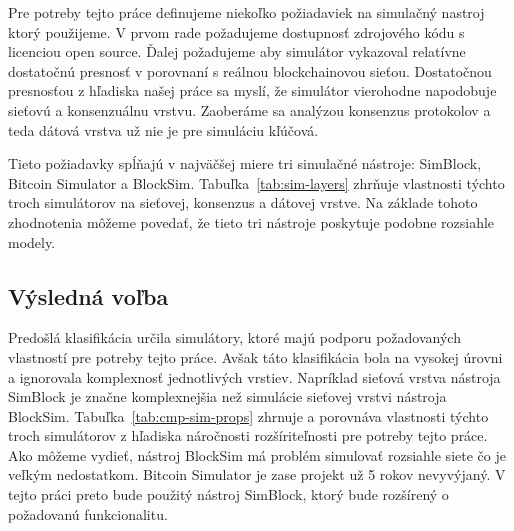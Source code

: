 Pre potreby tejto práce definujeme niekoľko požiadaviek na simulačný nastroj ktorý použijeme. V prvom rade požadujeme dostupnosť zdrojového kódu s licenciou open source. Ďalej požadujeme aby simulátor vykazoval relatívne dostatočnú presnosť v porovnaní s reálnou blockchainovou sieťou. Dostatočnou presnosťou z hľadiska našej práce sa myslí, že simulátor vierohodne napodobuje sieťovú a konsenzuálnu vrstvu. Zaoberáme sa analýzou konsenzus protokolov a teda dátová vrstva už nie je pre simuláciu kľúčová. 

Tieto požiadavky spĺňajú v najväčšej miere tri simulačné nástroje: SimBlock, Bitcoin Simulator a BlockSim. Tabuľka~\ref{tab:sim-layers} zhrňuje vlastnosti týchto troch simulátorov na sieťovej, konsenzus a dátovej vrstve. Na základe tohoto zhodnotenia môžeme povedať, že tieto tri nástroje poskytuje podobne rozsiahle modely.

\subsection{Výsledná voľba}

Predošlá klasifikácia určila simulátory, ktoré majú podporu požadovaných vlastností pre potreby tejto práce. Avšak táto klasifikácia bola na vysokej úrovni a ignorovala komplexnosť jednotlivých vrstiev. Napríklad sieťová vrstva nástroja SimBlock je značne komplexnejšia než simulácie sieťovej vrstvi nástroja BlockSim. Tabuľka~\ref{tab:cmp-sim-props} zhrnuje a porovnáva vlastnosti týchto troch simulátorov z hľadiska náročnosti rozšíriteľnosti pre potreby tejto práce. Ako môžeme vydieť, nástroj BlockSim má problém simulovať rozsiahle siete čo je veľkým nedostatkom. Bitcoin Simulator je zase projekt už 5 rokov nevyvýjaný. V tejto práci preto bude použitý nástroj SimBlock, ktorý bude rozšírený o požadovanú funkcionalitu. 

